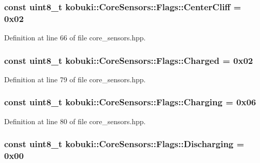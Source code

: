 \subsubsection[{\-Center\-Cliff}]{\setlength{\rightskip}{0pt plus 5cm}const uint8\-\_\-t {\bf kobuki\-::\-Core\-Sensors\-::\-Flags\-::\-Center\-Cliff} = 0x02\hspace{0.3cm}{\ttfamily  [static]}}\label{structkobuki_1_1CoreSensors_1_1Flags_a1b5e6cb42d25bec2e9030341f4b8df4b}


\-Definition at line 66 of file core\-\_\-sensors.\-hpp.

\subsubsection[{\-Charged}]{\setlength{\rightskip}{0pt plus 5cm}const uint8\-\_\-t {\bf kobuki\-::\-Core\-Sensors\-::\-Flags\-::\-Charged} = 0x02\hspace{0.3cm}{\ttfamily  [static]}}\label{structkobuki_1_1CoreSensors_1_1Flags_a37a146ce9d17489e29223cf8eda52731}


\-Definition at line 79 of file core\-\_\-sensors.\-hpp.

\subsubsection[{\-Charging}]{\setlength{\rightskip}{0pt plus 5cm}const uint8\-\_\-t {\bf kobuki\-::\-Core\-Sensors\-::\-Flags\-::\-Charging} = 0x06\hspace{0.3cm}{\ttfamily  [static]}}\label{structkobuki_1_1CoreSensors_1_1Flags_a944248c28c8097de503af120b1afe3e6}


\-Definition at line 80 of file core\-\_\-sensors.\-hpp.

\subsubsection[{\-Discharging}]{\setlength{\rightskip}{0pt plus 5cm}const uint8\-\_\-t {\bf kobuki\-::\-Core\-Sensors\-::\-Flags\-::\-Discharging} = 0x00\hspace{0.3cm}{\ttfamily  [static]}}\label{structkobuki_1_1CoreSensors_1_1Flags_a7478f59ea180abc589c314a9be8c6d52}


